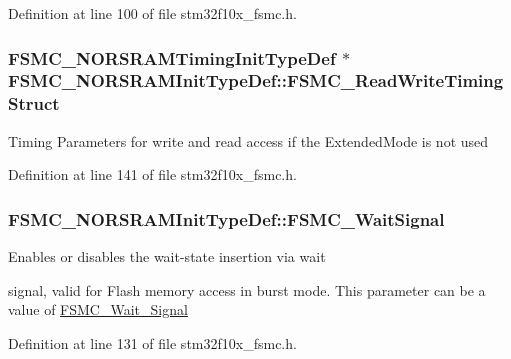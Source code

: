 Definition at line 100 of file stm32f10x\-\_\-fsmc.\-h.

\hypertarget{struct_f_s_m_c___n_o_r_s_r_a_m_init_type_def_a89727833f179b72ede3f11396c01732c}{
\subsubsection[{F\-S\-M\-C\-\_\-\-Read\-Write\-Timing\-Struct}]{\setlength{\rightskip}{0pt plus 5cm}F\-S\-M\-C\-\_\-\-N\-O\-R\-S\-R\-A\-M\-Timing\-Init\-Type\-Def $\ast$ F\-S\-M\-C\-\_\-\-N\-O\-R\-S\-R\-A\-M\-Init\-Type\-Def\-::\-F\-S\-M\-C\-\_\-\-Read\-Write\-Timing\-Struct}}\label{struct_f_s_m_c___n_o_r_s_r_a_m_init_type_def_a89727833f179b72ede3f11396c01732c}
Timing Parameters for write and read access if the Extended\-Mode is not used 

Definition at line 141 of file stm32f10x\-\_\-fsmc.\-h.

\hypertarget{struct_f_s_m_c___n_o_r_s_r_a_m_init_type_def_aedbc7df3ff61cc93a910a64dc53c932b}{
\subsubsection[{F\-S\-M\-C\-\_\-\-Wait\-Signal}]{ F\-S\-M\-C\-\_\-\-N\-O\-R\-S\-R\-A\-M\-Init\-Type\-Def\-::\-F\-S\-M\-C\-\_\-\-Wait\-Signal}}\label{struct_f_s_m_c___n_o_r_s_r_a_m_init_type_def_aedbc7df3ff61cc93a910a64dc53c932b}
\begin{DoxyVerb}          Enables or disables the wait-state insertion via wait
\end{DoxyVerb}
 signal, valid for Flash memory access in burst mode. This parameter can be a value of \hyperlink{group___f_s_m_c___wait___signal}{F\-S\-M\-C\-\_\-\-Wait\-\_\-\-Signal} 

Definition at line 131 of file stm32f10x\-\_\-fsmc.\-h.

